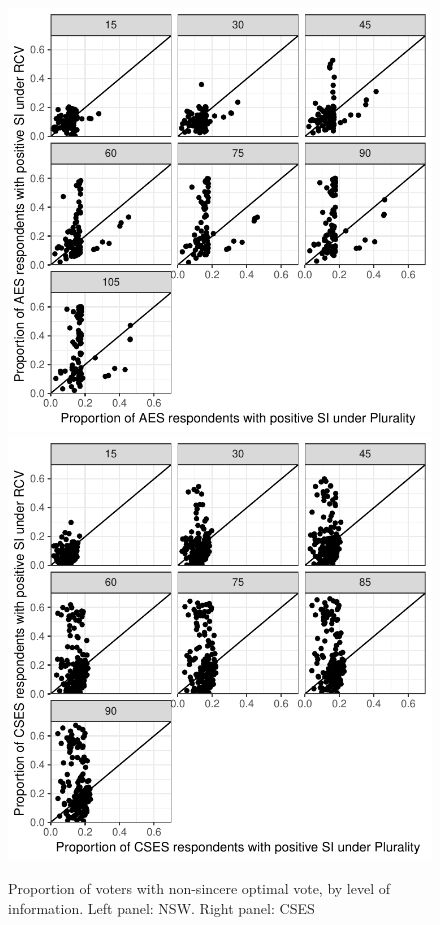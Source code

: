\documentclass[11pt, letter, margin = 2 in]{article}
\begin{document}
\begin{figure}[!h]
	\centering
	\includegraphics[width = .45 \textwidth]{"../output/figures/australia_sv_prop"}
	\includegraphics[width = .45 \textwidth]{"../output/figures/cses_prop"}
	\caption{Proportion of voters with non-sincere optimal vote, by level of information. Left panel: NSW. Right panel: CSES}
	\label{fig:figure1}
\end{figure}
\end{document}
